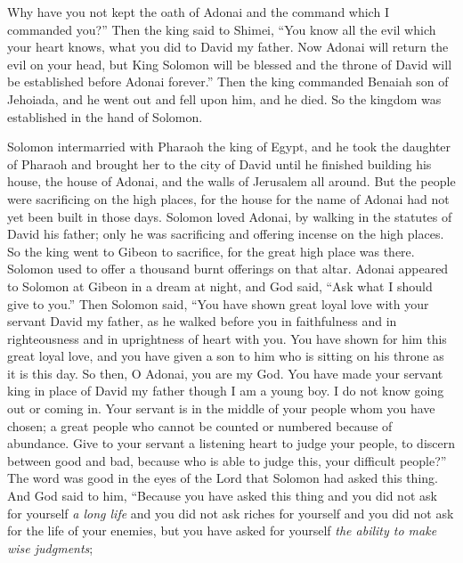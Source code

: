 \begin{biblechapter}
\verse Why have you not kept the oath of Adonai and the command which I commanded you?”
\verse Then the king said to Shimei, “You know all the evil which your heart knows, what you did to David my father. Now Adonai will return the evil on your head,
\verse but King Solomon will be blessed and the throne of David will be established before Adonai forever.”
\verse Then the king commanded Benaiah son of Jehoiada, and he went out and fell upon him, and he died. So the kingdom was established in the hand of Solomon.
\end{biblechapter}

\begin{biblechapter} %
 Solomon intermarried with Pharaoh the king of Egypt, and he took the daughter of Pharaoh and brought her to the city of David until he finished building his house, the house of Adonai, and the walls of Jerusalem all around.
\verse But the people were sacrificing on the high places, for the house for the name of Adonai had not yet been built in those days.
\verse Solomon loved Adonai, by walking in the statutes of David his father; only he was sacrificing and offering incense on the high places.
\verse So the king went to Gibeon to sacrifice, for the great high place was there. Solomon used to offer a thousand burnt offerings on that altar.
 Adonai appeared to Solomon at Gibeon in a dream at night, and God said, “Ask what I should give to you.”
\verse Then Solomon said, “You have shown great loyal love with your servant David my father, as he walked before you in faithfulness and in righteousness and in uprightness of heart with you. You have shown for him this great loyal love, and you have given a son to him who is sitting on his throne as it is this day.
\verse So then, O Adonai, you are my God. You have made your servant king in place of David my father though I am a young boy. I do not know going out or coming in.
\verse Your servant is in the middle of your people whom you have chosen; a great people who cannot be counted or numbered because of abundance.
\verse Give to your servant a listening heart to judge your people, to discern between good and bad, because who is able to judge this, your difficult people?”
\verse The word was good in the eyes of the Lord that Solomon had asked this thing.
\verse And God said to him, “Because you have asked this thing and you did not ask for yourself \textit{a long life} and you did not ask riches for yourself and you did not ask for the life of your enemies, but you have asked for yourself \textit{the ability to make wise judgments};

\end{biblechapter}
